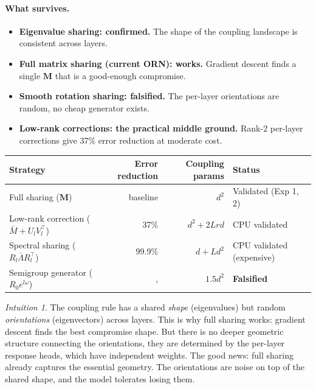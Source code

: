 \documentclass[11pt, a4paper]{article}
\newcommand{\M}{\mathbf{M}}
\theoremstyle{remark}
\newtheorem*{intuition}{Intuition}
\begin{document}
\paragraph{What survives.}
\begin{itemize}[nosep]
    \item \textbf{Eigenvalue sharing: confirmed.} The shape of the coupling landscape is consistent across layers.
    \item \textbf{Full matrix sharing (current ORN): works.} Gradient descent finds a single $\M$ that is a good-enough compromise.
    \item \textbf{Smooth rotation sharing: falsified.} The per-layer orientations are random, no cheap generator exists.
    \item \textbf{Low-rank corrections: the practical middle ground.} Rank-2 per-layer corrections give 37\% error reduction at moderate cost.
\end{itemize}

\begin{center}\small
\renewcommand{\arraystretch}{1.2}
\begin{tabular}{@{}lrrl@{}}
\toprule
\textbf{Strategy} & \textbf{Error reduction} & \textbf{Coupling params} & \textbf{Status} \\
\midrule
Full sharing ($\M$) & baseline & $d^2$ & Validated (Exp 1, 2) \\
Low-rank correction ($\bar{M} + U_l V_l^\top$) & 37\% & $d^2 + 2Lrd$ & CPU validated \\
Spectral sharing ($R_l \bar{\Lambda} R_l^\top$) & 99.9\% & $d + Ld^2$ & CPU validated (expensive) \\
Semigroup generator ($R_0 e^{l\omega}$) & ,  & $1.5d^2$ & \textbf{Falsified} \\
\bottomrule
\end{tabular}
\end{center}

\begin{intuition}
The coupling rule has a shared \emph{shape} (eigenvalues) but random \emph{orientations} (eigenvectors) across layers.
This is why full sharing works: gradient descent finds the best compromise shape.
But there is no deeper geometric structure connecting the orientations, they are determined by the per-layer response heads, which have independent weights.
The good news: full sharing already captures the essential geometry.
The orientations are noise on top of the shared shape, and the model tolerates losing them.
\end{intuition}
\end{document}
